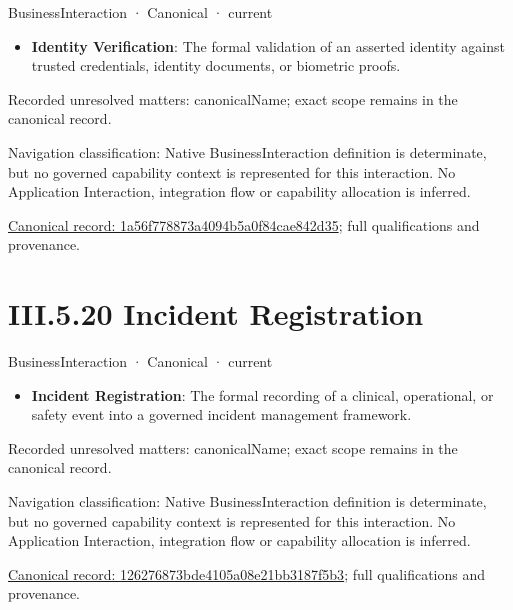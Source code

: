 \label{element:1a56f778873a4094b5a0f84cae842d35}
{\small BusinessInteraction · Canonical · current}\par

\begin{itemize}


\item \textbf{Identity Verification}: The formal validation of an asserted identity against trusted credentials, identity documents, or biometric proofs.

\end{itemize}

{\small Recorded unresolved matters: canonicalName; exact scope remains in the canonical record.}\par
{\small Navigation classification: Native BusinessInteraction definition is determinate, but no governed capability context is represented for this interaction. No Application Interaction, integration flow or capability allocation is inferred.}\par
{\footnotesize \href{../../../../../../../continuum/business/business-interaction/1a56f778873a4094b5a0f84cae842d35.md}{Canonical record: 1a56f778873a4094b5a0f84cae842d35}; full qualifications and provenance.}\par
\section*{III.5.20 Incident Registration}
\label{navigation:III.5.20}

\label{element:126276873bde4105a08e21bb3187f5b3}
{\small BusinessInteraction · Canonical · current}\par

\begin{itemize}


\item \textbf{Incident Registration}: The formal recording of a clinical, operational, or safety event into a governed incident management framework.

\end{itemize}

{\small Recorded unresolved matters: canonicalName; exact scope remains in the canonical record.}\par
{\small Navigation classification: Native BusinessInteraction definition is determinate, but no governed capability context is represented for this interaction. No Application Interaction, integration flow or capability allocation is inferred.}\par
{\footnotesize \href{../../../../../../../continuum/business/business-interaction/126276873bde4105a08e21bb3187f5b3.md}{Canonical record: 126276873bde4105a08e21bb3187f5b3}; full qualifications and provenance.}\par
